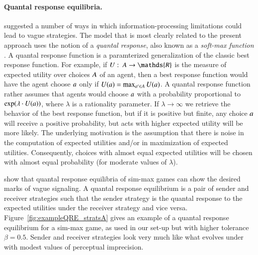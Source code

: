\documentclass[fleqn,reqno,10pt]{article}
\newcommand{\rdd}{\acro{rdd}} %
\newcommand{\toler}{\ensuremath{\beta}} %
\begin{document}
\paragraph{Quantal response equilibria.}
\citet{FrankeJager2010:Vagueness-Signa} suggested a number of ways in
which information-processing limitations could lead to vague
strategies. The model that is most clearly related to the present
approach uses the notion of a \emph{quantal response}, also known as a
\emph{soft-max function}
\citep[e.g.][]{Luce1959:Individual-Choi,McFadden1976:Quantal-Choice-,GoereeHolt2008:Quantal-Respons}. A
quantal response function is a paramterized generalization of the
classic best response function. For example, if $U \mycolon \Acts
\rightarrow \mathds{R}$ is the measure of expected utility over
choices $A$ of an agent, then a best response function would have
the agent choose $a$ only if $U(a) = \max_{a' \in A}
U(a)$. A quantal response function rather assumes that agents would
choose $a$ with a probability proportional to $\operatorname{exp}(\lambda \cdot
U(a))$, where $\lambda$ is a rationality parameter. If $\lambda
\rightarrow \infty$ we retrieve the behavior of the best response
function, but if it is positive but finite, any choice $a$ will
receive a positive probability, but acts with higher expected utility
will be more likely. The underlying motivation is the assumption that
there is noise in the computation of expected utilities and/or in
maximization of expected utilities. Consequently, choices with almost
equal expected utilities will be chosen with almost equal probability
(for moderate values of $\lambda$).

\citet{FrankeJager2010:Vagueness-Signa} show that quantal response
equilibria of sim-max games can show the desired marks of vague
signaling. A quantal response equilibrium is a pair of sender and
receiver strategies such that the sender strategy is the quantal
response to the expected utilities under the receiver strategy and
vice versa. Figure~\ref{fig:exampleQRE_stratsA} gives an example of a
quantal response equilibrium for a sim-max game, as used in our set-up
but with higher tolerance $\toler = 0.5$. Sender and receiver
strategies look very much like what evolves under \rdd with modest
values of perceptual imprecision.
\end{document}
